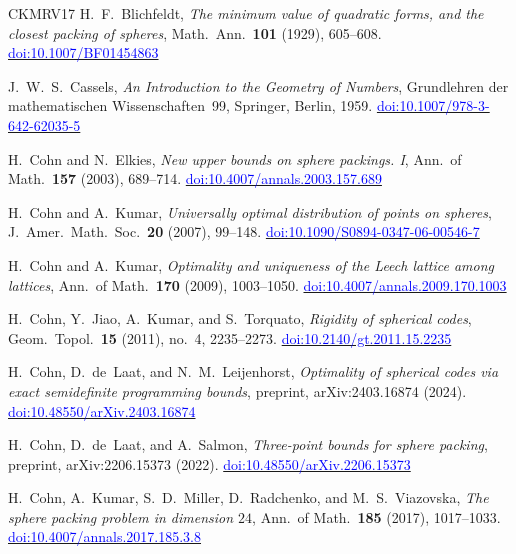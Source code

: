\documentclass[11pt,reqno]{amsart}
\newcommand{\bluelink}[2]{\href{#1}{\textcolor{blue}{#2}}}
\renewcommand{\_}{\origunderscore\allowbreak}
\numberwithin{equation}{section}
\theoremstyle{plain}
\theoremstyle{definition}
\theoremstyle{remark}
\begin{document}
\begin{thebibliography}{CKMRV17}
H.~F.~Blichfeldt,
\textit{The minimum value of quadratic forms, and the closest packing of spheres},
Math.\ Ann.\ \textbf{101} (1929), 605--608.
\bluelink{https://doi.org/10.1007/BF01454863}{doi:10.1007/BF01454863}

J.~W.~S.~Cassels,
\textit{An Introduction to the Geometry of Numbers},
Grundlehren der mathematischen Wissenschaften~99, Springer, Berlin, 1959.
\bluelink{https://doi.org/10.1007/978-3-642-62035-5}{doi:10.1007/978-3-642-62035-5}

H.~Cohn and N.~Elkies,
\textit{New upper bounds on sphere packings. {I}},
Ann.\ of Math.\ \textbf{157} (2003), 689--714.
\bluelink{https://doi.org/10.4007/annals.2003.157.689}{doi:10.4007/annals.2003.157.689}

H.~Cohn and A.~Kumar,
\textit{Universally optimal distribution of points on spheres},
J.\ Amer.\ Math.\ Soc.\ \textbf{20} (2007), 99--148.
\bluelink{https://doi.org/10.1090/S0894-0347-06-00546-7}{doi:10.1090/S0894-0347-06-00546-7}

H.~Cohn and A.~Kumar,
\textit{Optimality and uniqueness of the {L}eech lattice among lattices},
Ann.\ of Math.\ \textbf{170} (2009), 1003--1050.
\bluelink{https://doi.org/10.4007/annals.2009.170.1003}{doi:10.4007/annals.2009.170.1003}

H.~Cohn, Y.~Jiao, A.~Kumar, and S.~Torquato,
\textit{Rigidity of spherical codes},
Geom.\ Topol.\ \textbf{15} (2011), no.~4, 2235--2273.
\bluelink{https://doi.org/10.2140/gt.2011.15.2235}{doi:10.2140/gt.2011.15.2235}

H.~Cohn, D.~de~Laat, and N.~M.~Leijenhorst,
\textit{Optimality of spherical codes via exact semidefinite programming
bounds},
preprint, arXiv:2403.16874 (2024).
\bluelink{https://doi.org/10.48550/arXiv.2403.16874}{doi:10.48550/arXiv.2403.16874}

H.~Cohn, D.~de~Laat, and A.~Salmon,
\textit{Three-point bounds for sphere packing},
preprint, arXiv:2206.15373 (2022).
\bluelink{https://doi.org/10.48550/arXiv.2206.15373}{doi:10.48550/arXiv.2206.15373}

H.~Cohn, A.~Kumar, S.~D.~Miller, D.~Radchenko, and M.~S.~Viazovska,
\textit{The sphere packing problem in dimension $24$},
Ann.\ of Math.\ \textbf{185} (2017), 1017--1033.
\bluelink{https://doi.org/10.4007/annals.2017.185.3.8}{doi:10.4007/annals.2017.185.3.8}


\end{thebibliography}
\end{document}

